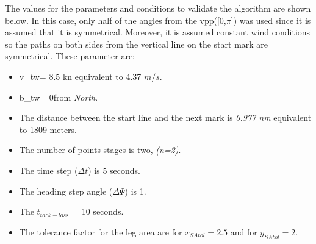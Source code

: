 The values for the parameters and conditions to validate the algorithm are shown below. In this case, only half of the angles from the \acrshort{vpp}([0,$\pi$]) was used since it is assumed that it is symmetrical. Moreover, it is assumed constant wind conditions so the paths on both sides from the vertical line on the start mark are symmetrical. These parameter are:
\begin{itemize}
    \item \acrshort{v_tw}= 8.5 kn equivalent to 4.37 $ m/s $.
    \item \acrshort{b_tw}= 0\degree  from \textit{North}. 
    \item The distance between the start line and the next mark is \textit{0.977 nm} equivalent to 1809 meters. %
    \item The number of points stages is two, \textit{(n=2)}.
    \item The time step ($\Delta t$) is 5 seconds.
    \item The heading step angle ($\Delta \Psi$) is 1\degree. %
    \item The $t_{tack-loss}$ = 10 seconds.
    \item The tolerance factor for the leg area are for $x_{SAtol}=2.5$ and for $y_{SAtol}=2$.
\end{itemize}

